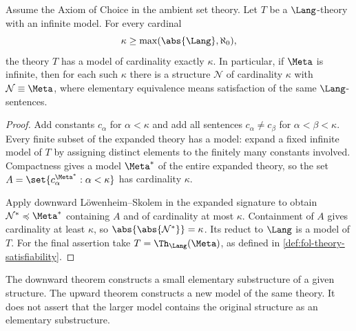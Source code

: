 \begin{theorem}
\label{thm:upward-ls}
Assume the Axiom of Choice in the ambient set theory.  Let \(T\) be a
\(\Lang\)-theory with an infinite model.  For every cardinal
\[
 \kappa\geq\max(\abs{\Lang},\aleph_0),
\]
the theory \(T\) has a model of cardinality exactly \(\kappa\).  In
particular, if \(\Meta\) is infinite, then for each such \(\kappa\) there is
a structure \(\mathcal N\) of cardinality \(\kappa\) with
\(\mathcal N\equiv\Meta\), where elementary equivalence means satisfaction of
the same \(\Lang\)-sentences.
\end{theorem}
\begin{proof}
Add constants \(c_\alpha\) for \(\alpha<\kappa\) and add all sentences
\(c_\alpha\ne c_\beta\) for \(\alpha<\beta<\kappa\).  Every finite subset of
the expanded theory has a model: expand a fixed infinite model of \(T\) by
assigning distinct elements to the finitely many constants involved.
Compactness gives a model \(\Meta^*\) of the entire expanded theory, so the
set
\(A=\set{c_\alpha^{\Meta^*}:\alpha<\kappa}\) has cardinality \(\kappa\).

Apply downward L\"owenheim--Skolem in the expanded signature to obtain
\(\mathcal N^*\preccurlyeq\Meta^*\) containing \(A\) and of cardinality at
most \(\kappa\).  Containment of \(A\) gives cardinality at least \(\kappa\),
so \(\abs{\abs{\mathcal N^*}}=\kappa\).  Its reduct to \(\Lang\) is a model
 of \(T\).  For the final assertion take \(T=\Th_{\Lang}(\Meta)\), as
defined in \cref{def:fol-theory-satisfiability}.
\end{proof}

The downward theorem constructs a small elementary substructure of a given
structure.  The upward theorem constructs a new model of the same theory.  It
does not assert that the larger model contains the original structure as an
elementary substructure.

